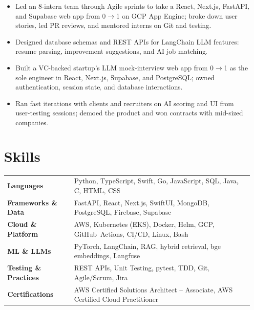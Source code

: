\documentclass[11pt, letterpaper]{article}
\begin{document}
\vspace{1pt}
\begin{itemize}
  \item Led an 8-intern team through Agile sprints to take a React, Next.js, FastAPI, and Supabase web app from 0$\to$1 on GCP App Engine; broke down user stories, led PR reviews, and mentored interns on Git and testing.
  \item Designed database schemas and REST APIs for LangChain LLM features: resume parsing, improvement suggestions, and AI job matching.
\end{itemize}

\vspace{1pt}
\begin{itemize}
  \item Built a VC-backed startup's LLM mock-interview web app from 0$\to$1 as the sole engineer in React, Next.js, Supabase, and PostgreSQL; owned authentication, session state, and database interactions.
  \item Ran fast iterations with clients and recruiters on AI scoring and UI from user-testing sessions; demoed the product and won contracts with mid-sized companies.
\end{itemize}

\section{Skills}
\begin{tabularx}{\textwidth}{@{}l @{\hspace{7pt}} >{\raggedright\arraybackslash}X@{}}
  \textbf{Languages} & Python, TypeScript, Swift, Go, JavaScript, SQL, Java, C, HTML, CSS \\[1pt]
  \textbf{Frameworks \& Data} & FastAPI, React, Next.js, SwiftUI, MongoDB, PostgreSQL, Firebase, Supabase \\[1pt]
  \textbf{Cloud \& Platform} & AWS, Kubernetes (EKS), Docker, Helm, GCP, GitHub~Actions, CI/CD, Linux, Bash \\[1pt]
  \textbf{ML \& LLMs} & PyTorch, LangChain, RAG, hybrid retrieval, bge embeddings, Langfuse \\[1pt]
  \textbf{Testing \& Practices} & REST APIs, Unit Testing, pytest, TDD, Git, Agile/Scrum, Jira \\[1pt]
  \textbf{Certifications} & AWS Certified Solutions Architect -- Associate, AWS Certified Cloud Practitioner \\
\end{tabularx}
\end{document}
